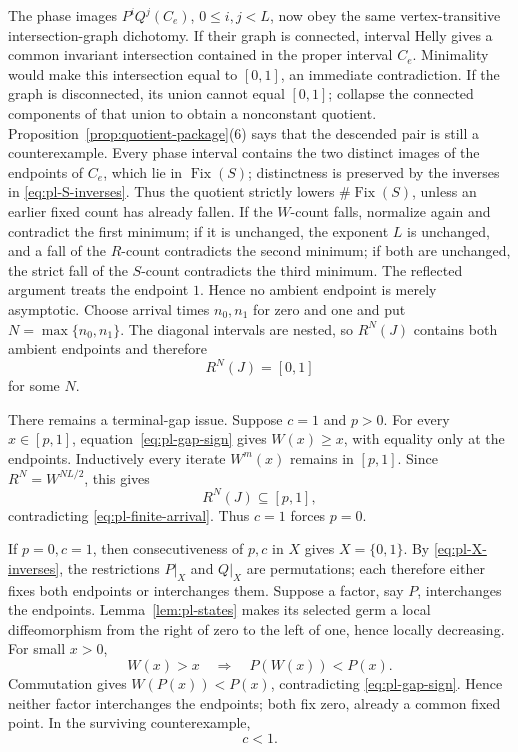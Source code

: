 \documentclass[11pt]{article}
\theoremstyle{definition}
\theoremstyle{remark}
\newcommand{\I}{[0,1]}
\newcommand{\Fix}{\operatorname{Fix}}
\begin{document}
The phase images \(P^iQ^j(C_e)\), \(0\leq i,j<L\), now obey the same
vertex-transitive intersection-graph dichotomy.  If their graph is
connected, interval Helly gives a common invariant intersection contained in
the proper interval \(C_e\).  Minimality would make this intersection equal
to $\I$, an immediate contradiction.  If the graph is disconnected, its
union cannot equal $\I$; collapse the connected components of that union to
obtain a nonconstant quotient.  Proposition~\ref{prop:quotient-package}(6) says
that the descended pair is still a counterexample.  Every phase interval
contains the two distinct
images of the endpoints of \(C_e\), which lie in \(\Fix(S)\); distinctness
is preserved by the inverses in \eqref{eq:pl-S-inverses}.
Thus the quotient strictly lowers \(\#\Fix(S)\), unless an earlier fixed
count has already fallen.  If the \(W\)-count falls, normalize again and
contradict the first minimum; if it is unchanged, the exponent \(L\) is
unchanged, and a fall of the \(R\)-count contradicts the second minimum; if
both are unchanged, the strict fall of the \(S\)-count contradicts the third
minimum.  The reflected argument treats the endpoint \(1\).  Hence no
ambient endpoint is merely asymptotic.  Choose arrival times \(n_0,n_1\)
for zero and one and put \(N=\max\{n_0,n_1\}\).  The diagonal intervals are
nested, so \(R^N(J)\) contains both ambient endpoints and therefore
\begin{equation}\label{eq:pl-finite-arrival}
 R^N(J)=\I
\end{equation}
for some \(N\).

There remains a terminal-gap issue.  Suppose \(c=1\) and \(p>0\).
For every \(x\in[p,1]\), equation~\eqref{eq:pl-gap-sign} gives
\(W(x)\geq x\), with equality only at the endpoints.  Inductively every
iterate \(W^m(x)\) remains in \([p,1]\).  Since
\(R^N=W^{NL/2}\), this gives
\[
 R^N(J)\subseteq[p,1],
\]
contradicting \eqref{eq:pl-finite-arrival}.  Thus \(c=1\) forces \(p=0\).

If \(p=0,c=1\), then consecutiveness of \(p,c\) in \(X\) gives
\(X=\{0,1\}\).  By \eqref{eq:pl-X-inverses}, the restrictions \(P|_X\) and
\(Q|_X\) are permutations; each therefore either fixes both endpoints or
interchanges them.  Suppose a factor, say \(P\), interchanges the endpoints.
Lemma~\ref{lem:pl-states} makes its selected germ a local
diffeomorphism from the right of zero to the left of one, hence locally
decreasing.  For small \(x>0\),
\[
 W(x)>x\quad\Longrightarrow\quad P(W(x))<P(x).
\]
Commutation gives \(W(P(x))<P(x)\), contradicting
\eqref{eq:pl-gap-sign}.  Hence neither factor interchanges the
endpoints; both fix zero, already a common fixed point.  In the surviving
counterexample,
\begin{equation}\label{eq:pl-c-internal}
 c<1.
\end{equation}
\end{document}
